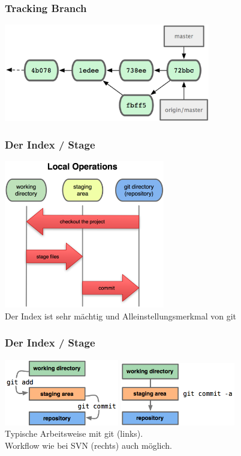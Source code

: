 \begin{frame}
  \frametitle{Tracking Branch}
  \begin{center}
    \includegraphics[width=9cm]{img/remote_3.png}
  \end{center}
\end{frame}

\begin{frame}
  \frametitle{Der Index / Stage}
  \vspace{-0.3cm}
  \begin{center}
    \includegraphics[width=7cm]{img/staging.png} \\
    Der Index ist sehr mächtig und Alleinstellungsmerkmal von git
  \end{center}
\end{frame}

\begin{frame}
  \frametitle{Der Index / Stage}
  \begin{center}
    \includegraphics[width=5cm]{img/index1.png} \hspace{0.5cm} \includegraphics[width=5cm]{img/index2.png} \\
    \vspace{1cm}
    Typische Arbeitsweise mit git (links). \\ Workflow wie bei SVN (rechts) auch möglich.
  \end{center}
\end{frame}

